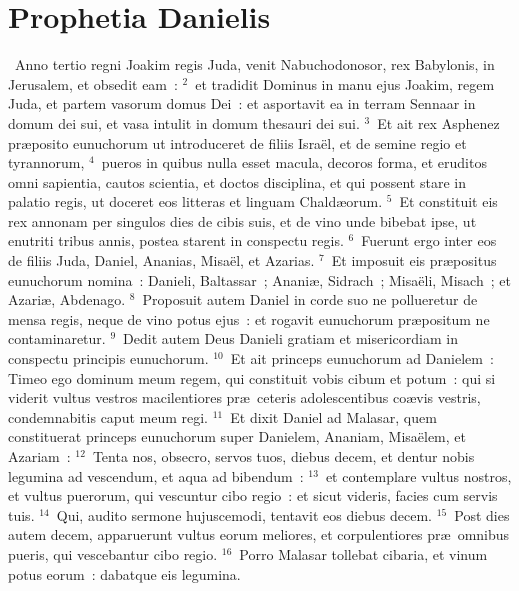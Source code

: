 {\centering \section*{Prophetia Danielis}}\thispagestyle{empty}

~\lettrine[lines=10,image=true,loversize=0.05,lraise=-0.03]{A}{}nno tertio regni Joakim regis Juda, venit Nabuchodonosor, rex Babylonis, in Jerusalem, et obsedit eam~:
${}^{2}$~et tradidit Dominus in manu ejus Joakim, regem Juda, et partem vasorum domus Dei~: et asportavit ea in terram Sennaar in domum dei sui, et vasa intulit in domum thesauri dei sui.
${}^{3}$~Et ait rex Asphenez pr\ae posito eunuchorum ut introduceret de filiis Isra\"el, et de semine regio et tyrannorum,
${}^{4}$~pueros in quibus nulla esset macula, decoros forma, et eruditos omni sapientia, cautos scientia, et doctos disciplina, et qui possent stare in palatio regis, ut doceret eos litteras et linguam Chald\ae orum.
${}^{5}$~Et constituit eis rex annonam per singulos dies de cibis suis, et de vino unde bibebat ipse, ut enutriti tribus annis, postea starent in conspectu regis.
${}^{6}$~Fuerunt ergo inter eos de filiis Juda, Daniel, Ananias, Misa\"el, et Azarias.
${}^{7}$~Et imposuit eis pr\ae positus eunuchorum nomina~: Danieli, Baltassar~; Anani\ae , Sidrach~; Misa\"eli, Misach~; et Azari\ae , Abdenago.
${}^{8}$~Proposuit autem Daniel in corde suo ne pollueretur de mensa regis, neque de vino potus ejus~: et rogavit eunuchorum pr\ae positum ne contaminaretur.
${}^{9}$~Dedit autem Deus Danieli gratiam et misericordiam in conspectu principis eunuchorum.
${}^{10}$~Et ait princeps eunuchorum ad Danielem~: Timeo ego dominum meum regem, qui constituit vobis cibum et potum~: qui si viderit vultus vestros macilentiores pr\ae\ ceteris adolescentibus co\ae vis vestris, condemnabitis caput meum regi.
${}^{11}$~Et dixit Daniel ad Malasar, quem constituerat princeps eunuchorum super Danielem, Ananiam, Misa\"elem, et Azariam~:
${}^{12}$~Tenta nos, obsecro, servos tuos, diebus decem, et dentur nobis legumina ad vescendum, et aqua ad bibendum~:
${}^{13}$~et contemplare vultus nostros, et vultus puerorum, qui vescuntur cibo regio~: et sicut videris, facies cum servis tuis.
${}^{14}$~Qui, audito sermone hujuscemodi, tentavit eos diebus decem.
${}^{15}$~Post dies autem decem, apparuerunt vultus eorum meliores, et corpulentiores pr\ae\ omnibus pueris, qui vescebantur cibo regio.
${}^{16}$~Porro Malasar tollebat cibaria, et vinum potus eorum~: dabatque eis legumina.
